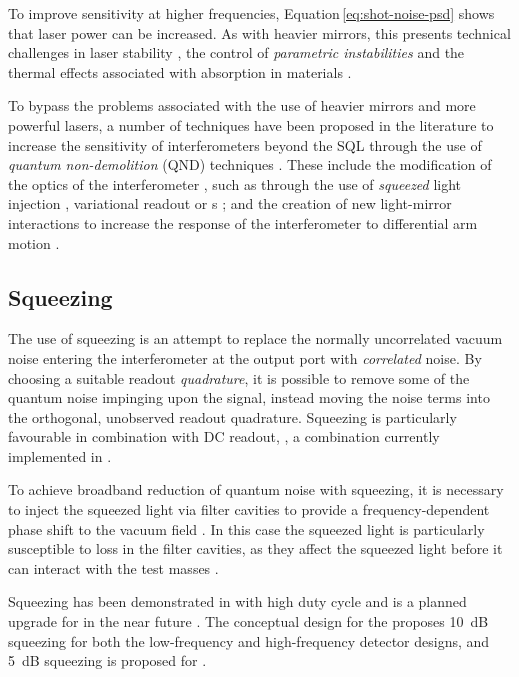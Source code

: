 To improve sensitivity at higher frequencies, Equation\,\ref{eq:shot-noise-psd} shows that laser power can be increased. As with heavier mirrors, this presents technical challenges in laser stability \cite{Hildebrandt2007}, the control of \emph{parametric instabilities} \cite{Evans2015} and the thermal effects associated with absorption in materials \cite{Steinlechner2016}.

To bypass the problems associated with the use of heavier mirrors and more powerful lasers, a number of techniques have been proposed in the literature to increase the sensitivity of interferometers beyond the \gls{SQL} through the use of \emph{quantum non-demolition} (\gls{QND}) techniques \cite{Braginsky1995}. These include the modification of the optics of the interferometer \cite{Kimble2001}, such as through the use of \emph{squeezed} light injection \cite{Caves1981}, variational readout \cite{Vyatchanin1995, Vyatchanin1996} or \SM{}s \cite{Braginsky1990}; and the creation of new light-mirror interactions to increase the response of the interferometer to differential arm motion \cite{Chen2011}.

\subsection{\label{sec:squeezing}Squeezing}
The use of squeezing is an attempt to replace the normally uncorrelated vacuum noise entering the interferometer at the output port with \emph{correlated} noise. By choosing a suitable readout \emph{quadrature}, it is possible to remove some of the quantum noise impinging upon the signal, instead moving the noise terms into the orthogonal, unobserved readout quadrature. Squeezing is particularly favourable in combination with \gls{DC} readout, , a combination currently implemented in \GEOHF{} \cite{Willke2006, Affeldt2014}.

To achieve broadband reduction of quantum noise with squeezing, it is necessary to inject the squeezed light via filter cavities to provide a frequency-dependent phase shift to the vacuum field \cite{Kimble2001}. In this case the squeezed light is particularly susceptible to loss in the filter cavities, as they affect the squeezed light before it can interact with the test masses \cite{Kwee2014}.

Squeezing has been demonstrated in \GEOHF{} with high duty cycle \cite{Grote2013} and is a planned upgrade for \ALIGO{} in the near future \cite{Miller2015}. The conceptual design for the \ET{} proposes \SI{10}{\deci\bel} squeezing for both the low-frequency and high-frequency detector designs, and \SI{5}{\deci\bel} squeezing is proposed for \LIGOCE{}.

